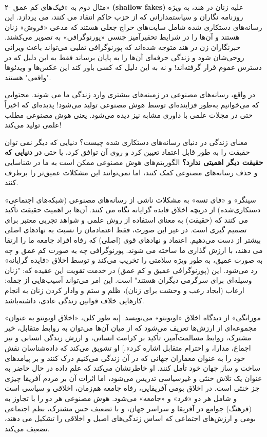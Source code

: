 \paragraph{}
۲- مثال دوم به «فیک‌های کم عمق» \textenglish{\textbf{(shallow fakes)}} علیه زنان در هند، به ویژه روزنامه نگاران و سیاستمدارانی که از حزب حاکم انتقاد می کنند، می پردازد.
این رسانه‌های دستکاری شده شامل سایت‌های حراج جعلی هستند که مدعی «فروش» زنان هستند و آن‌ها را در شرایط تحقیرآمیز جنسی «پورنوگرافی» به تصویر می‌کشند.
خبرنگاران زن در هند متوجه شده‌اند که پورنوگرافی تقلبی می‌تواند باعث ویرانی روحی‌شان شود و زندگی حرفه‌ای آن‌ها را به پایان برساند فقط به این دلیل که در دسترس عموم قرار گرفته‌اند!
و نه به این دلیل که کسی باور کند این عکس‌ها و ویدئوها "واقعی" هستند.

در واقع، رسانه‌های مصنوعی در زمینه‌های بیشتری وارد زندگی ما می شوند.
محتوایی که می‌خوانیم به‌طور فزاینده‌ای توسط هوش مصنوعی تولید می‌شود!
پدیده‌ای که اخیراً حتی در مجلات علمی با داوری مشابه نیز دیده می‌شود.
یعنی هوش مصنوعی مطلب علمی تولید می‌کند!

معنای زندگی در دنیای رسانه‌های دستکاری شده چیست؟ دنیایی که دیگر نمی توان حقیقت را به طور قابل اعتماد تعیین کرد و روی آن توافق کرد، یا حتی  \textbf{در دنیایی که حقیقت دیگر اهمیتی ندارد؟}
الگوریتم‌های هوش مصنوعی ممکن است به ما در شناسایی و حذف رسانه‌های مصنوعی کمک کنند، اما نمی‌توانند این مشکلات عمیق‌تر را برطرف کنند.

«سینگر» و «فای تسه» به مشکلات ناشی از رسانه‌های مصنوعی (شبکه‌های اجتماعی دستکاری‌شده) از دریچه اخلاق فایده گرایانه نگاه می کنند.
آن‌ها بر اهمیت حقیقت تأکید می کنند که (حقیقت) به معنای استفاده از روش علمی و شواهد تجربی معتبر برای تصمیم گیری است.
در غیر این صورت، فقط اعتمادمان را نسبت به نهاد‌های اصلی بیشتر از دست می‌دهیم.
اعتماد و نهادهای قوی (اصلی) که رفاه افراد جامعه ما را ارتقا می دهند، با ارزش گذاری ما ساخته می شوند.
پورنوگرافی چه به صورت کم عمق و چه به صورت عمیق، به طور ویژه سلامتی را تخریب می‌کند و توسط اخلاق «فایده گرایانه» رد می‌شود.
این (پورنوگرافی عمیق و کم عمق) در خدمت تقویت این عقیده که: "زنان وسیله‌ای برای سرگرمی دیگران هستند" است.
این امر می‌تواند آسیب‌هایی از جمله: ارعاب (ایجاد رعب و وحشت برای زنان)، ظلم و ستم و وادار کردن زنان به انجام کارهایی خلاف قوانین زندگی عادی، داشته‌باشد.

«مورانگی» از دیدگاه اخلاق «اوبونتو» می‌نویسد.
[به طور کلی، «اخلاق اوبونتو به عنوان مجموعه‌ای از ارزش‌ها تعریف می‌شود که از میان آن‌ها می‌توان به روابط متقابل، خیر مشترک، روابط مسالمت‌آمیز، تأکید بر کرامت انسانی، و ارزش زندگی انسانی و نیز اجماع، مدارا، و احترام متقابل اشاره کرد».]
او تشویق می‌کند که داده‌شناسان نقش خود را به عنوان معماران جهانی که در آن زندگی می‌کنیم درک کنند و بر پیامدهای ساخت و ساز جهان خود تأمل کنند.
او خاطرنشان می‌کند که علم داده در حال حاضر به عنوان یک تلاش خنثی و غیرسیاسی تدریس می‌شود، اما اثرات آن بر مردم آفریقا چیزی جز خنثی است.
در اخلاق بومی آفریقایی، رفاه جامعه هم‌زمان، اخلاقی و سیاسی است و شامل هر دو «فرد» و «جامعه» می‌شود.
هوش مصنوعی هر دو را با تجاوز به (فرهنگ) جوامع در آفریقا و سراسر جهان، و با تضعیف حس مشترک، نظم اجتماعی بومی و ارزش‌های اجتماعی که اساس زندگی‌های اصیل و اخلاقی را تشکیل می دهند، تضعیف می‌کند.

